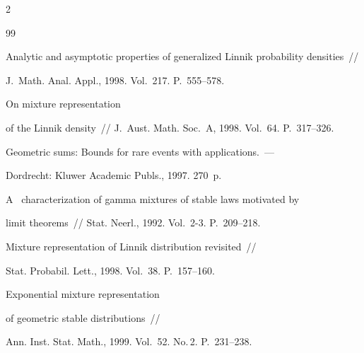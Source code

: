 \begin{multicols}{2}
{{\begin{thebibliography}{99}




Analytic and asymptotic properties of generalized Linnik probability densities~//


J.~Math. Anal. Appl., 1998. Vol.~217. P.~555--578.







 On mixture representation


 of the Linnik density~// J.~Aust. Math. Soc.~A, 1998. Vol.~64. P.~317--326.


 


 \pagebreak







 Geometric sums: Bounds for rare events with applications.~--- 


Dordrecht: Kluwer Academic Publs., 1997. 270~p.







 A~ characterization of gamma mixtures of stable laws motivated by 


limit theorems~// Stat. Neerl., 1992. Vol.~2-3. P.~209--218.







 Mixture representation of Linnik distribution revisited~// 


Stat. Probabil. Lett., 1998. Vol.~38. P.~157--160.







 Exponential mixture representation 


of geometric stable distributions~// 


Ann. Inst. Stat. Math., 1999. Vol.~52. No.\,2. P.~231--238.


 \end{thebibliography}





 }


 }





\end{multicols}





